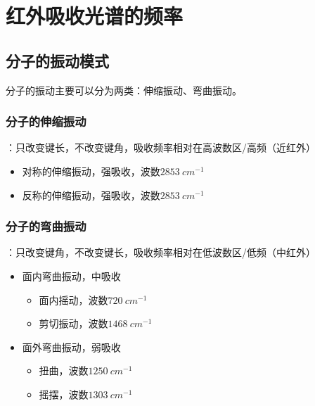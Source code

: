 \section{红外吸收光谱的频率}

\subsection{分子的振动模式}
分子的振动主要可以分为两类：伸缩振动、弯曲振动。

\subsubsection{分子的伸缩振动}
：只改变键长，不改变键角，吸收频率相对在高波数区/高频（近红外）
\begin{itemize}
    \item 对称的伸缩振动，强吸收，波数$\SI{2853}{cm^{-1}}$
    \item 反称的伸缩振动，强吸收，波数$\SI{2853}{cm^{-1}}$
\end{itemize}

\subsubsection{分子的弯曲振动}
：只改变键角，不改变键长，吸收频率相对在低波数区/低频（中红外）
\begin{itemize}
    \item 面内弯曲振动，中吸收
    \begin{itemize}
        \item 面内摇动，波数$\SI{720}{cm^{-1}}$
        \item 剪切振动，波数$\SI{1468}{cm^{-1}}$
    \end{itemize}
    \item 面外弯曲振动，弱吸收
    \begin{itemize}
        \item 扭曲，波数$\SI{1250}{cm^{-1}}$
        \item 摇摆，波数$\SI{1303}{cm^{-1}}$
    \end{itemize}
\end{itemize}

